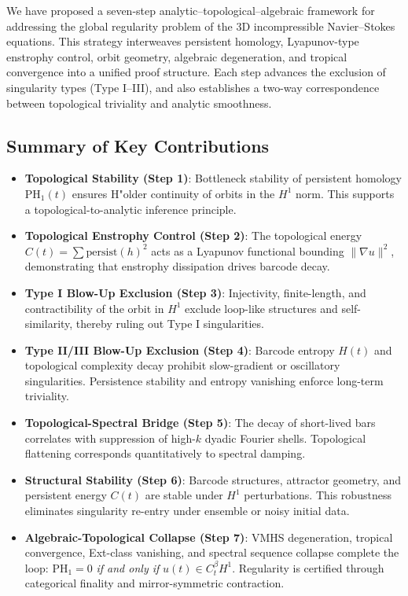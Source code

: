 \documentclass[11pt]{article}
\theoremstyle{definition}
\begin{document}
We have proposed a seven-step analytic–topological–algebraic framework for addressing the global regularity problem of the 3D incompressible Navier–Stokes equations. This strategy interweaves persistent homology, Lyapunov-type enstrophy control, orbit geometry, algebraic degeneration, and tropical convergence into a unified proof structure. Each step advances the exclusion of singularity types (Type I–III), and also establishes a two-way correspondence between topological triviality and analytic smoothness.

\subsection*{Summary of Key Contributions}

\begin{itemize}
    \item \textbf{Topological Stability (Step 1)}: Bottleneck stability of persistent homology $\mathrm{PH}_1(t)$ ensures H"older continuity of orbits in the $H^1$ norm. This supports a topological-to-analytic inference principle.

    \item \textbf{Topological Enstrophy Control (Step 2)}: The topological energy $C(t) = \sum \mathrm{persist}(h)^2$ acts as a Lyapunov functional bounding $\|\nabla u\|^2$, demonstrating that enstrophy dissipation drives barcode decay.

    \item \textbf{Type I Blow-Up Exclusion (Step 3)}: Injectivity, finite-length, and contractibility of the orbit in $H^1$ exclude loop-like structures and self-similarity, thereby ruling out Type I singularities.

    \item \textbf{Type II/III Blow-Up Exclusion (Step 4)}: Barcode entropy $H(t)$ and topological complexity decay prohibit slow-gradient or oscillatory singularities. Persistence stability and entropy vanishing enforce long-term triviality.

    \item \textbf{Topological-Spectral Bridge (Step 5)}: The decay of short-lived bars correlates with suppression of high-$k$ dyadic Fourier shells. Topological flattening corresponds quantitatively to spectral damping.

    \item \textbf{Structural Stability (Step 6)}: Barcode structures, attractor geometry, and persistent energy $C(t)$ are stable under $H^1$ perturbations. This robustness eliminates singularity re-entry under ensemble or noisy initial data.

    \item \textbf{Algebraic-Topological Collapse (Step 7)}: VMHS degeneration, tropical convergence, Ext-class vanishing, and spectral sequence collapse complete the loop: $\mathrm{PH}_1 = 0$ \textit{if and only if} $u(t) \in C_t^\beta H^1$. Regularity is certified through categorical finality and mirror-symmetric contraction.
\end{itemize}
\end{document}
